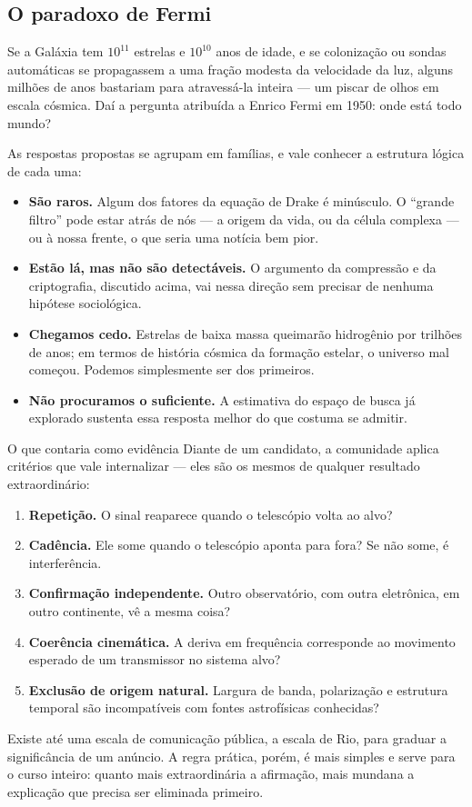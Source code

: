 \documentclass[11pt,a4paper]{article}
\begin{document}
\subsection*{O paradoxo de Fermi}

Se a Galáxia tem $10^{11}$ estrelas e $10^{10}$ anos de idade, e se colonização ou sondas automáticas se propagassem a uma fração modesta da velocidade da luz, alguns milhões de anos bastariam para atravessá-la inteira --- um piscar de olhos em escala cósmica. Daí a pergunta atribuída a Enrico Fermi em 1950: onde está todo mundo?

As respostas propostas se agrupam em famílias, e vale conhecer a estrutura lógica de cada uma:

\begin{itemize}
\item \textbf{São raros.} Algum dos fatores da equação de Drake é minúsculo. O ``grande filtro'' pode estar atrás de nós --- a origem da vida, ou da célula complexa --- ou à nossa frente, o que seria uma notícia bem pior.
\item \textbf{Estão lá, mas não são detectáveis.} O argumento da compressão e da criptografia, discutido acima, vai nessa direção sem precisar de nenhuma hipótese sociológica.
\item \textbf{Chegamos cedo.} Estrelas de baixa massa queimarão hidrogênio por trilhões de anos; em termos de história cósmica da formação estelar, o universo mal começou. Podemos simplesmente ser dos primeiros.
\item \textbf{Não procuramos o suficiente.} A estimativa do espaço de busca já explorado sustenta essa resposta melhor do que costuma se admitir.
\end{itemize}

\begin{lessonblock}{O que contaria como evidência}
Diante de um candidato, a comunidade aplica critérios que vale internalizar --- eles são os mesmos de qualquer resultado extraordinário:
\begin{enumerate}
\item \textbf{Repetição.} O sinal reaparece quando o telescópio volta ao alvo?
\item \textbf{Cadência.} Ele some quando o telescópio aponta para fora? Se não some, é interferência.
\item \textbf{Confirmação independente.} Outro observatório, com outra eletrônica, em outro continente, vê a mesma coisa?
\item \textbf{Coerência cinemática.} A deriva em frequência corresponde ao movimento esperado de um transmissor no sistema alvo?
\item \textbf{Exclusão de origem natural.} Largura de banda, polarização e estrutura temporal são incompatíveis com fontes astrofísicas conhecidas?
\end{enumerate}
Existe até uma escala de comunicação pública, a escala de Rio, para graduar a significância de um anúncio. A regra prática, porém, é mais simples e serve para o curso inteiro: quanto mais extraordinária a afirmação, mais mundana a explicação que precisa ser eliminada primeiro.
\end{lessonblock}
\end{document}
